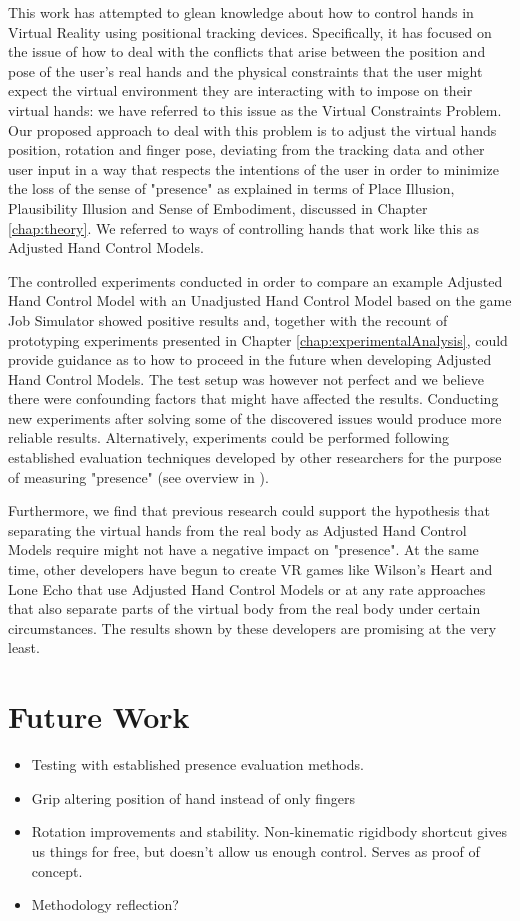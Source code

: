 This work has attempted to glean knowledge about how to control hands in Virtual Reality using positional tracking devices. Specifically, it has focused on the issue of how to deal with the conflicts that arise between the position and pose of the user's real hands and the physical constraints that the user might expect the virtual environment they are interacting with to impose on their virtual hands: we have referred to this issue as the Virtual Constraints Problem. Our proposed approach to deal with this problem is to adjust the virtual hands position, rotation and finger pose, deviating from the tracking data and other user input in a way that respects the intentions of the user in order to minimize the loss  of the sense of "presence" as explained in terms of Place Illusion, Plausibility Illusion and Sense of Embodiment, discussed in Chapter \ref{chap:theory}. We referred to ways of controlling hands that work like this as Adjusted Hand Control Models.

The controlled experiments conducted in order to compare an example Adjusted Hand Control Model with an Unadjusted Hand Control Model based on the game Job Simulator showed positive results and, together with the recount of prototyping experiments presented in Chapter \ref{chap:experimentalAnalysis}, could provide guidance as to how to proceed in the future when developing Adjusted Hand Control Models. The test setup was however not perfect and we believe there were confounding factors that might have affected the results. Conducting new experiments after solving some of the discovered issues would produce more reliable results. Alternatively, experiments could be performed following established evaluation techniques developed by other researchers for the purpose of measuring "presence" (see overview in \parencite{Schuemie2001}).

Furthermore, we find that previous research could support the hypothesis that separating the virtual hands from the real body as Adjusted Hand Control Models require might not have a negative impact on "presence". At the same time, other developers have begun to create VR games like Wilson's Heart and Lone Echo that use Adjusted Hand Control Models or at any rate approaches that also separate parts of the virtual body from the real body under certain circumstances. The results shown by these developers are promising at the very least.


\section{Future Work}
\label{sec:futureWork}

\begin{itemize}
\item Testing with established presence evaluation methods.
\item Grip altering position of hand instead of only fingers
\item Rotation improvements and stability. Non-kinematic rigidbody shortcut gives us things for free, but doesn't allow us enough control. Serves as proof of concept.
\item Methodology reflection?
\end{itemize}